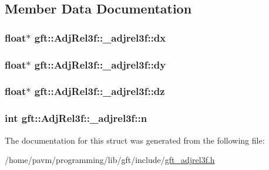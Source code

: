 \subsection{Member Data Documentation}
\hypertarget{structgft_1_1AdjRel3f_1_1__adjrel3f_a01376a362ee6239ec87f0698a0bbdbaf}{
\subsubsection[{dx}]{\setlength{\rightskip}{0pt plus 5cm}float$\ast$ gft\-::\-Adj\-Rel3f\-::\-\_\-adjrel3f\-::dx}}\label{structgft_1_1AdjRel3f_1_1__adjrel3f_a01376a362ee6239ec87f0698a0bbdbaf}
\hypertarget{structgft_1_1AdjRel3f_1_1__adjrel3f_a218f31b93e97d95f354d7e20ab005802}{
\subsubsection[{dy}]{\setlength{\rightskip}{0pt plus 5cm}float$\ast$ gft\-::\-Adj\-Rel3f\-::\-\_\-adjrel3f\-::dy}}\label{structgft_1_1AdjRel3f_1_1__adjrel3f_a218f31b93e97d95f354d7e20ab005802}
\hypertarget{structgft_1_1AdjRel3f_1_1__adjrel3f_a9f5466eaebc904592f473a52da0f9127}{
\subsubsection[{dz}]{\setlength{\rightskip}{0pt plus 5cm}float$\ast$ gft\-::\-Adj\-Rel3f\-::\-\_\-adjrel3f\-::dz}}\label{structgft_1_1AdjRel3f_1_1__adjrel3f_a9f5466eaebc904592f473a52da0f9127}
\hypertarget{structgft_1_1AdjRel3f_1_1__adjrel3f_af1b74ab4843c76ffb8aef6ebcd06b086}{
\subsubsection[{n}]{\setlength{\rightskip}{0pt plus 5cm}int gft\-::\-Adj\-Rel3f\-::\-\_\-adjrel3f\-::n}}\label{structgft_1_1AdjRel3f_1_1__adjrel3f_af1b74ab4843c76ffb8aef6ebcd06b086}


The documentation for this struct was generated from the following file\-:\begin{DoxyCompactItemize}
\item 
/home/pavm/programming/lib/gft/include/\hyperlink{gft__adjrel3f_8h}{gft\-\_\-adjrel3f.\-h}\end{DoxyCompactItemize}
